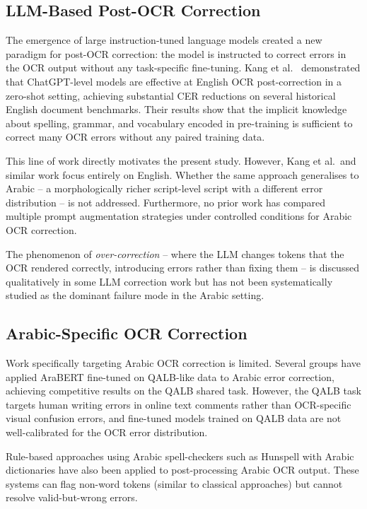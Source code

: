 \subsection{LLM-Based Post-OCR Correction}
\label{subsec:related_llm}

The emergence of large instruction-tuned language models created a new paradigm
for post-OCR correction: the model is instructed to correct errors in the OCR
output without any task-specific fine-tuning.
Kang et al.\ \cite{kang2024llmocr} demonstrated that ChatGPT-level models are
effective at English OCR post-correction in a zero-shot setting, achieving
substantial CER reductions on several historical English document benchmarks.
Their results show that the implicit knowledge about spelling, grammar, and
vocabulary encoded in pre-training is sufficient to correct many OCR errors
without any paired training data.

This line of work directly motivates the present study.
However, Kang et al.\ and similar work focus entirely on English.
Whether the same approach generalises to Arabic -- a morphologically richer
script-level script with a different error distribution -- is not addressed.
Furthermore, no prior work has compared multiple prompt augmentation strategies
under controlled conditions for Arabic OCR correction.

The phenomenon of \emph{over-correction} -- where the LLM changes tokens that
the OCR rendered correctly, introducing errors rather than fixing them -- is
discussed qualitatively in some LLM correction work but has not been
systematically studied as the dominant failure mode in the Arabic setting.

\subsection{Arabic-Specific OCR Correction}
\label{subsec:related_arabic}

Work specifically targeting Arabic OCR correction is limited.
Several groups have applied AraBERT fine-tuned on QALB-like data to Arabic
error correction, achieving competitive results on the QALB shared task.
However, the QALB task targets human writing errors in online text comments
rather than OCR-specific visual confusion errors, and fine-tuned models trained
on QALB data are not well-calibrated for the OCR error distribution.

Rule-based approaches using Arabic spell-checkers such as Hunspell with Arabic
dictionaries have also been applied to post-processing Arabic OCR output.
These systems can flag non-word tokens (similar to classical approaches) but
cannot resolve valid-but-wrong errors.

